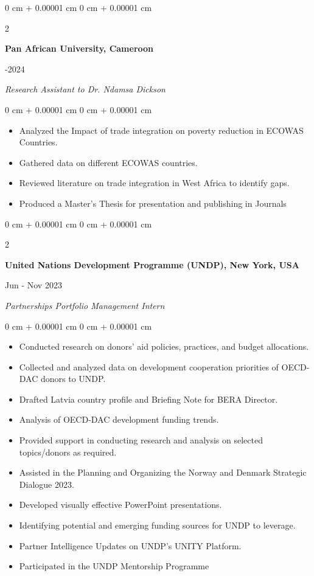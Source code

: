 \documentclass[10pt, letterpaper]{article}
\newenvironment{onecolentry}{
    \begin{adjustwidth}{
        0 cm + 0.00001 cm
    }{
        0 cm + 0.00001 cm
    }
}{
    \end{adjustwidth}
} %
\newenvironment{twocolentry}[2][]{
    \onecolentry
    \def\secondColumn{#2}
    \setcolumnwidth{\fill, 4.5 cm}
    \begin{paracol}{2}
}{
    \switchcolumn \raggedleft \secondColumn
    \end{paracol}
    \endonecolentry
} %
\begin{document}
\vspace{0.3cm}
\begin{twocolentry}{
2023-2024
}
    \textbf{Pan African University, Cameroon}    
\end{twocolentry}
    \textit{Research Assistant to Dr. Ndamsa Dickson}
    \begin{onecolentry}
            \begin{itemize}
\item Analyzed the Impact of trade integration on poverty reduction in ECOWAS Countries. 
       \item  Gathered data on different ECOWAS countries.
       \item Reviewed literature on trade integration in West Africa to identify gaps. 
       \item Produced a Master’s Thesis for presentation and publishing in Journals
   \end{itemize}
   \end{onecolentry}

\begin{twocolentry}{
Jun - Nov 2023
}
\textbf{United Nations Development Programme (UNDP), New York, USA}
\end{twocolentry}
\textit{Partnerships Portfolio Management Intern}
\begin{onecolentry}
     \begin{itemize}
     \item Conducted research on donors' aid policies, practices, and budget allocations.
     \item Collected and analyzed data on development cooperation priorities of OECD-DAC donors to UNDP.
     \item Drafted Latvia country profile and Briefing Note for BERA Director.
     \item Analysis of OECD-DAC development funding trends.
     \item Provided support in conducting research and analysis on selected topics/donors as required.
     \item Assisted in the Planning and Organizing the Norway and Denmark Strategic Dialogue 2023.
     \item Developed visually effective PowerPoint presentations.
     \item Identifying potential and emerging funding sources for UNDP to leverage. 

     \item Partner Intelligence Updates on UNDP’s UNITY Platform.
     \item Participated in the UNDP Mentorship Programme
 \end{itemize}
\end{onecolentry}
\end{document}
